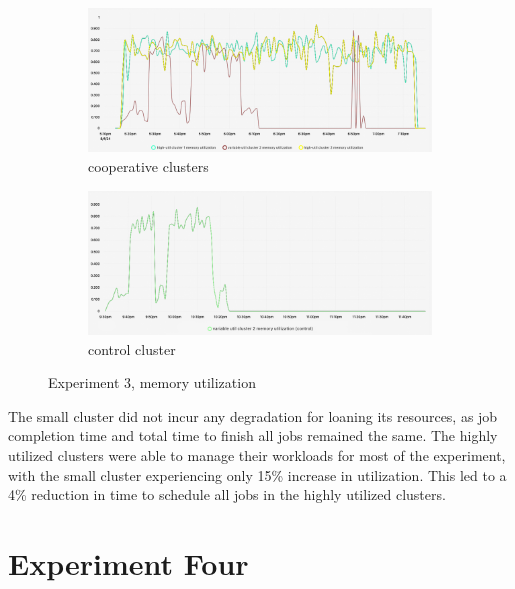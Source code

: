 \begin{figure}[H]
\centering
\begin{subfigure}{.5\textwidth}
  \centering
  \includegraphics[width=.9\linewidth]{./figures/experiment-three/exp-three-coop.png}
  \caption{cooperative clusters}
  \label{fig:exp3coop}
\end{subfigure}%
\begin{subfigure}{.5\textwidth}
  \centering
  \includegraphics[width=.9\linewidth]{./figures/experiment-three/exp-three-control.png}
  \caption{control cluster}
  \label{fig:exp3control}
\end{subfigure}
\caption{Experiment 3, memory utilization}
\label{fig:exp3memutil}
\end{figure}

The small cluster did not incur any degradation for loaning its resources, as
job completion time and total time to finish all jobs remained the same. The
highly utilized clusters were able to manage their workloads for most of the
experiment, with the small cluster experiencing only 15\% increase in
utilization. This led to a  4\% reduction in time to schedule all jobs in the
highly utilized clusters. 


\section{Experiment Four}

